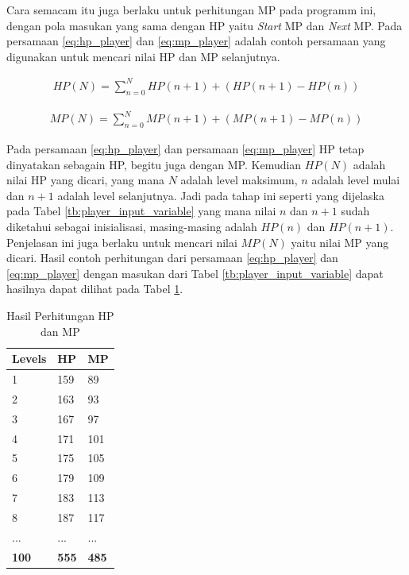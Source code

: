 Cara semacam itu juga berlaku untuk perhitungan MP pada programm ini, dengan pola masukan yang sama dengan HP yaitu \textit{Start} MP dan \textit{Next} MP. Pada persamaan \ref{eq:hp_player} dan \ref{eq:mp_player} adalah contoh persamaan yang digunakan untuk mencari nilai HP dan MP selanjutnya.

\begin{equation}\label{eq:hp_player}
	\begin{split}
		HP(N) = \sum_{n = 0}^{N} HP(n + 1) + \left(HP(n + 1) - HP(n) \right)
	\end{split}
\end{equation}

\begin{equation}\label{eq:mp_player}
	\begin{split}
		MP(N) = \sum_{n = 0}^{N} MP(n + 1) + \left(MP(n + 1) - MP(n) \right)
	\end{split}
\end{equation}

Pada persamaan \ref{eq:hp_player} dan persamaan \ref{eq:mp_player} HP tetap dinyatakan sebagain HP, begitu juga dengan MP. Kemudian $HP(N)$ adalah nilai HP yang dicari, yang mana $N$ adalah level maksimum, $n$ adalah level mulai dan $n + 1$ adalah level selanjutnya. Jadi pada tahap ini seperti yang dijelaska pada Tabel \ref{tb:player_input_variable} yang mana nilai $n$ dan $n + 1$ sudah diketahui sebagai inisialisasi, masing-masing adalah $HP(n)$ dan $HP(n + 1)$. Penjelasan ini juga berlaku untuk mencari nilai $MP(N)$ yaitu nilai MP yang dicari. Hasil contoh perhitungan dari persamaan \ref{eq:hp_player} dan \ref{eq:mp_player} dengan masukan dari Tabel \ref{tb:player_input_variable} dapat hasilnya dapat dilihat pada Tabel \ref{tb:player_hp_mp}. 

\begin{table}[h!]
	\centering
	\caption{Hasil Perhitungan HP dan MP}
	\label{tb:player_hp_mp}
	\begin{tabular}{|l|l|l|}
		\hline
		\rowcolor[HTML]{C0C0C0} 
		\textbf{Levels} & \textbf{HP} & \textbf{MP} \\ \hline
		1 & 159 & 89 \\ \hline
		2 & 163 & 93 \\ \hline
		3 & 167 & 97 \\ \hline
		4 & 171 & 101 \\ \hline
		5 & 175 & 105 \\ \hline
		6 & 179 & 109 \\ \hline
		7 & 183 & 113 \\ \hline
		8 & 187 & 117 \\ \hline
		... & ... & ... \\ \hline
		\textbf{100} & \textbf{555} & \textbf{485} \\ \hline
	\end{tabular}
\end{table}

